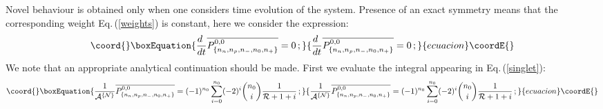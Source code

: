 \documentclass[a4paper,11pt]{article}
\begin{document}
Novel behaviour is obtained only when one considers time evolution
of the system. Presence of an exact symmetry means that the
corresponding weight Eq.\,(\ref{weights}) is constant,  here we
consider the expression:
\begin{equation}\coord{}\boxEquation{\label{cond2}
\frac{d\ }{dt}\overline{P^{0,0}_{\{n_n,n_p,n_{-},n_0,n_{+}\}}}
 =0\,;
}{\frac{d\ }{dt}\overline{P^{0,0}_{\{n_n,n_p,n_{-},n_0,n_{+}\}}}
 =0\,;
}{ecuacion}\coordE{}\end{equation}
We note that an appropriate analytical continuation should be
made. First we evaluate the integral appearing in
Eq.\,(\ref{singlet}):
\begin{equation}\coord{}\boxEquation{\label{singldiscr}
\frac{1}{{\cal A}^{\{{\cal
N}\}}}\overline{P^{0,0}_{\{n_n,n_p,n_{-},n_0,n_{+}\}}}=
(-1)^{n_0}\sum_{i=0}^{n_0}(-2)^i{n_0\choose i}\frac{1}{{\cal
R}+1+i}\,;
}{\frac{1}{{\cal A}^{\{{\cal
N}\}}}\overline{P^{0,0}_{\{n_n,n_p,n_{-},n_0,n_{+}\}}}=
(-1)^{n_0}\sum_{i=0}^{n_0}(-2)^i{n_0\choose i}\frac{1}{{\cal
R}+1+i}\,;
}{ecuacion}\coordE{}\end{equation}
\end{document}
